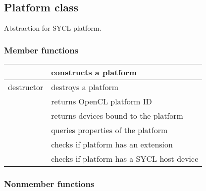 \documentclass[letterpaper,10pt,english]{sphinxmanual}
\begin{document}
\subsection{Platform class}
\label{\detokenize{programming-interface/runtime/platform:platform-class}}\label{\detokenize{programming-interface/runtime/platform::doc}}
\begin{sphinxVerbatim}[commandchars=\\\{\}]
 
\end{sphinxVerbatim}

Abstraction for SYCL platform.
\subsubsection*{Member functions}


\begin{savenotes}\sphinxattablestart
\centering
\begin{tabulary}{\linewidth}[t]{|T|T|}
\hline

{\hyperref[\detokenize{programming-interface/runtime/platform:constructor}]{}}
&
constructs a platform
\\
\hline
destructor
&
destroys a platform
\\
\hline
{\hyperref[\detokenize{programming-interface/runtime/platform:get}]{}}
&
returns OpenCL platform ID
\\
\hline
{\hyperref[\detokenize{programming-interface/runtime/platform:get-devices}]{}}
&
returns devices bound to the platform
\\
\hline
{\hyperref[\detokenize{programming-interface/runtime/platform:get-info}]{}}
&
queries properties of the platform
\\
\hline
{\hyperref[\detokenize{programming-interface/runtime/platform:has-extension}]{}}
&
checks if platform has an extension
\\
\hline
{\hyperref[\detokenize{programming-interface/runtime/platform:is-host}]{}}
&
checks if platform has a SYCL host device
\\
\hline
\end{tabulary}
\par
\sphinxattableend\end{savenotes}
\subsubsection*{Nonmember functions}
\end{document}
